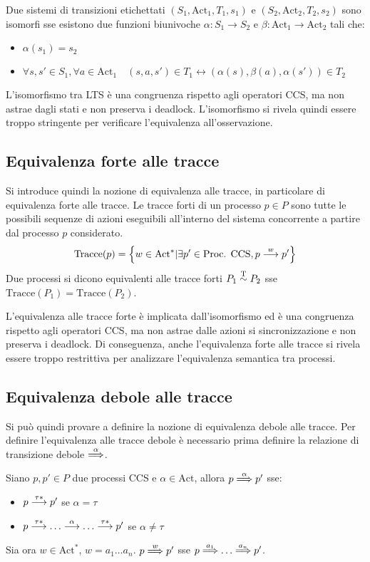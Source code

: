 Due sistemi di transizioni etichettati $(S_1, \text{Act}_1, T_1, s_1)$ e
$(S_2, \text{Act}_2, T_2, s_2)$ sono isomorfi sse esistono due funzioni biunivoche
$\alpha: S_1 \rightarrow S_2$ e $\beta: \text{Act}_1 \rightarrow \text{Act}_2$
tali che:
\begin{itemize}
    \item $\alpha(s_1) = s_2$
    \item $\forall s,s' \in S_1, \forall a \in \text{Act}_1 \quad
    (s,a,s') \in T_1 \leftrightarrow (\alpha (s), \beta (a), \alpha (s')) \in T_2$
\end{itemize}

L'isomorfismo tra LTS è una congruenza rispetto agli operatori CCS, ma
non astrae dagli stati e non preserva i deadlock. L'isomorfismo si rivela
quindi essere troppo stringente per verificare l'equivalenza
all'osservazione.

\subsection*{Equivalenza forte alle tracce}
Si introduce quindi la nozione di equivalenza alle tracce, in particolare
di equivalenza forte alle tracce.
Le tracce forti di un processo $p \in P$ sono tutte le possibili sequenze
di azioni eseguibili all'interno del sistema concorrente a partire dal processo
$p$ considerato.
\[
    \text{Tracce}(p) = \left\{w \in \text{Act}^* |
    \exists p' \in \text{Proc. CCS}, p \overset{w}{\longrightarrow} p'\right\}
\]
Due processi si dicono equivalenti alle tracce forti $P_1 \overset{\textnormal{T}}{\sim} P_2$ sse
$\text{Tracce}(P_1) = \text{Tracce}(P_2)$.

L'equivalenza alle tracce forte è implicata dall'isomorfismo ed è una congruenza
rispetto agli operatori CCS, ma non astrae dalle azioni si sincronizzazione
e non preserva i deadlock. Di conseguenza, anche l'equivalenza forte
alle tracce si rivela essere troppo restrittiva per analizzare l'equivalenza
semantica tra processi.

\subsection*{Equivalenza debole alle tracce}
Si può quindi provare a definire la nozione di equivalenza debole alle tracce.
Per definire l'equivalenza alle tracce debole è necessario prima definire
la relazione di transizione debole $\overset{\alpha}{\Longrightarrow}$.
\begin{defn}
    Siano $p, p' \in P$ due processi CCS e $\alpha \in \text{Act}$,
    allora $p \overset{\alpha}{\Longrightarrow} p'$ sse:
    \begin{itemize}
        \item $p \overset{\tau*}{\longrightarrow} p'$ se $\alpha = \tau$
        \item $p \overset{\tau*}{\longrightarrow} \ldots \overset{\alpha}{\longrightarrow} \ldots \overset{\tau*}{\longrightarrow} p'$
        se $\alpha \neq \tau$
    \end{itemize}

    Sia ora $w \in \text{Act}^*$, $w = a_1 \ldots a_n$. $p \overset{w}{\Longrightarrow} p'$ sse
    $p \overset{a_1}{\Longrightarrow} \ldots \overset{a_n}{\Longrightarrow} p'$.
\end{defn}

